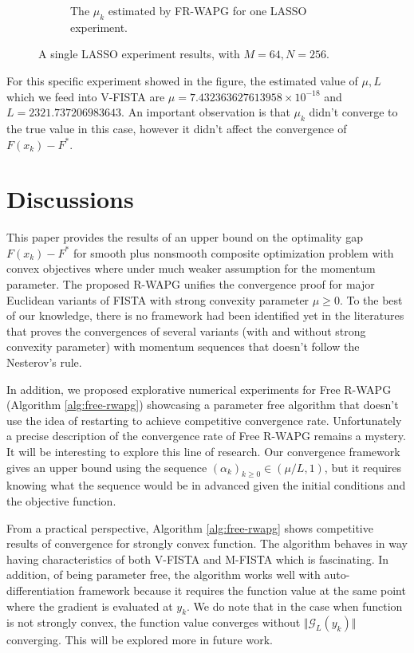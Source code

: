 \documentclass[12pt]{article}
\begin{document}
\begin{figure}[H]
\begin{subfigure}[b]{0.47\textwidth}
                    \caption{The $\mu_k$ estimated by FR-WAPG for one LASSO experiment. }
                \end{subfigure}
                \caption{A single LASSO experiment results, with $M = 64, N=256$.}
                \label{fig:single-lass-mu-estimates}
            \end{figure}
            For this specific experiment showed in the figure, the estimated value of $\mu, L$ which we feed into V-FISTA are $\mu = 7.432363627613958\times 10^{-18}$ and $L = 2321.737206983643$.
            An important observation is that $\mu_k$ didn't converge to the true value in this case, however it didn't affect the convergence of $F(x_k) - F^*$.

\section{Discussions}
    This paper provides the results of an upper bound on the optimality gap $F(x_k) - F^*$ for smooth plus nonsmooth composite optimization problem with convex objectives where under much weaker assumption for the momentum parameter.
    The proposed R-WAPG unifies the convergence proof for major Euclidean variants of FISTA with strong convexity parameter $\mu \ge 0$.
    To the best of our knowledge, there is no framework had been identified yet in the literatures that proves the convergences of several variants (with and without strong convexity parameter) with momentum sequences that doesn't follow the Nesterov's rule.
    \par
    In addition, we proposed explorative numerical experiments for Free R-WAPG (Algorithm \ref{alg:free-rwapg}) showcasing a parameter free algorithm that doesn't use the idea of restarting to achieve competitive convergence rate.
    Unfortunately a precise description of the convergence rate of Free R-WAPG remains a mystery.
    It will be interesting to explore this line of research.
    Our convergence framework gives an upper bound using the sequence $(\alpha_k)_{k \ge 0} \in (\mu/L, 1)$, but it requires knowing what the sequence would be in advanced given the initial conditions and the objective function.
    \par
    From a practical perspective, Algorithm \ref{alg:free-rwapg} shows competitive results of convergence for strongly convex function.
    The algorithm behaves in way having characteristics of both V-FISTA and M-FISTA which is fascinating.
    In addition, of being parameter free, the algorithm works well with auto-differentiation framework because it requires the function value at the same point where the gradient is evaluated at $y_k$.
    We do note that in the case when function is not strongly convex, the function value converges without $\Vert \mathcal G_L(y_k)\Vert$ converging.
    This will be explored more in future work.







\appendix
\end{document}
